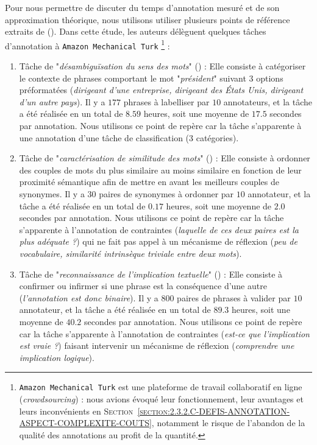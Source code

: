 			Pour nous permettre de discuter du temps d'annotation mesuré et de son approximation théorique, nous utilisons utiliser plusieurs points de référence extraits de (\cite{snow-etal:2008:cheap-fast-it}).
			Dans cette étude, les auteurs délèguent quelques tâches d'annotation à \texttt{Amazon Mechanical Turk} \footnote{
				\texttt{Amazon Mechanical Turk} est une plateforme de travail collaboratif en ligne (\textit{crowdsourcing}) : nous avions évoqué leur fonctionnement, leur avantages et leurs inconvénients en \textsc{Section~\ref{section:2.3.2.C-DEFIS-ANNOTATION-ASPECT-COMPLEXITE-COUTS}}, notamment le risque de l'abandon de la qualité des annotations au profit de la quantité.
			} :
			
			\begin{enumerate}
				\item Tâche de "\textit{désambiguïsation du sens des mots}" (\cite{pradhan-etal:2007:semeval2007-task-17}) :
				Elle consiste à catégoriser le contexte de phrases comportant le mot "\textit{président}" suivant $3$ options préformatées (\textit{dirigeant d'une entreprise, dirigeant des États Unis, dirigeant d'un autre pays}).
				Il y a $177$ phrases à labelliser par $10$ annotateurs, et la tâche a été réalisée en un total de $8.59$ heures, soit une moyenne de $17.5$ secondes par annotation.
				Nous utilisons ce point de repère car la tâche s'apparente à une annotation d'une tâche de classification ($3$ catégories).
				\item Tâche de "\textit{caractérisation de similitude des mots}" (\cite{miller-charles:1991:contextual-correlates-semantic}) :
				Elle consiste à ordonner des couples de mots du plus similaire au moins similaire en fonction de leur proximité sémantique afin de mettre en avant les meilleurs couples de synonymes.
				Il y a $30$ paires de synonymes à ordonner par $10$ annotateur, et la tâche a été réalisée en un total de $0.17$ heures, soit une moyenne de $2.0$ secondes par annotation.
				Nous utilisons ce point de repère car la tâche s'apparente à l'annotation de contraintes (\textit{laquelle de ces deux paires est la plus adéquate ?}) qui ne fait pas appel à un mécanisme de réflexion (\textit{peu de vocabulaire, similarité intrinsèque triviale entre deux mots}).
				\item Tâche de "\textit{reconnaissance de l'implication textuelle}" (\cite{dagan-etal:2005:pascal-recognising-textual}) :
				Elle consiste à confirmer ou infirmer si une phrase est la conséquence d'une autre (\textit{l'annotation est donc binaire}).
				Il y a $800$ paires de phrases à valider par $10$ annotateur, et la tâche a été réalisée en un total de $89.3$ heures, soit une moyenne de $40.2$ secondes par annotation.
				Nous utilisons ce point de repère car la tâche s'apparente à l'annotation de contraintes (\textit{est-ce que l'implication est vraie ?}) faisant intervenir un mécanisme de réflexion (\textit{comprendre une implication logique}).
			\end{enumerate}
